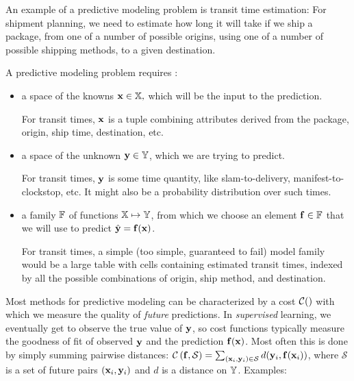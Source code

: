 \documentclass[11pt,openany,american,usenames,dvipsnames,svgnames,x11names,table,isodate]{article}
\numberwithin{equation}{section}
\numberwithin{figure}{section}
\begin{document}
An example of a predictive modeling problem is transit time estimation:
For shipment planning, we need to estimate how long it will take if
we ship a package, from one of a number of possible origins, using
one of a number of possible shipping methods, to a given destination. 

A predictive modeling problem requires 
\cite{friedman-2003,hastie-tibshirani-friedman-2009}:
\begin{itemize}
\item a space of the knowns ${\mathbf x}\in\mathbb{X},$ which will be the input to
the prediction. 


For transit times, ${\mathbf x}$ is a tuple combining attributes derived from
the package, origin, ship time, destination, etc. 

\item a space of the unknown ${\mathbf y}\in\mathbb{Y}$, which we are trying to predict. 


For transit times, ${\mathbf y}$ is some time quantity, like slam-to-delivery,
manifest-to-clockstop, etc. It might also be a probability distribution
over such times.

\item a family $\mathbb{F}$ of functions $\mathbb{X}\mapsto\mathbb{Y}$, from which
we choose an element ${\mathbf f}\in\mathbb{F}$ that we will use to predict $\hat{{\mathbf y}}={\mathbf f}({\mathbf x})$. 


For transit times, a simple (too simple, guaranteed to fail) model
family would be a large table with cells containing estimated transit
times, indexed by all the possible combinations of origin, ship method,
and destination. 

\end{itemize}
Most methods for predictive modeling can be characterized by a cost
$\mathcal{C}()$ with which we measure the quality of \emph{future }predictions.
In \emph{supervised} learning, we eventually get to observe the true
value of ${\mathbf y}$, so cost functions typically measure the goodness of
fit of observed ${\mathbf y}$ and the prediction ${\mathbf f}({\mathbf x})$. Most often this
is done by simply summing pairwise distances: 
$\mathcal{C}\left({\mathbf f},\mathcal{S}\right)=\sum_{({\mathbf x}_{i},{\mathbf y}_{i})\in\mathcal{S}}d({\mathbf y}_{i},{\mathbf f}({\mathbf x}_{i}))$,
where $\mathcal{S}$ is a set of future pairs $({\mathbf x}_{i},{\mathbf y}_{i})$ and $d$
is a  distance on $\mathbb{Y}$. Examples:
\end{document}
